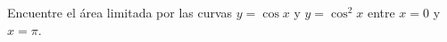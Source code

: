 \item Encuentre el área limitada por las curvas $y = \cos x$ y $y = \cos^2 x$ entre $x = 0$ y $x = \pi$.
